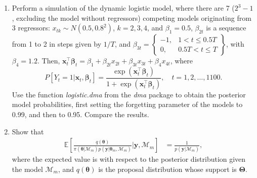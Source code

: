 \begin{enumerate}
\item Perform a simulation of the dynamic logistic model, where there are 7 ($2^3 - 1$, excluding the model without regressors) competing models originating from 3 regressors: $x_{tk} \sim N(0.5, 0.8^2)$, $k = 2, 3, 4$, and $\beta_1 = 0.5$, $\beta_{2t}$ is a sequence from 1 to 2 in steps given by $1/T$, and $\beta_{3t} = \begin{Bmatrix}
	-1, & 1 < t \leq 0.5T \\
	0, & 0.5T < t \leq T
\end{Bmatrix}$, with $\beta_4 = 1.2$. Then, $\bm{x}_t^{\top} \bm{\beta}_t = \beta_1 + \beta_{2t} x_{2t} + \beta_{3t} x_{3t} + \beta_4 x_{4t}$, where 
\[
P[Y_t = 1 | \bm{x}_t, \bm{\beta}_t] = \frac{\exp(\bm{x}_t^{\top} \bm{\beta}_t)}{1 + \exp(\bm{x}_t^{\top} \bm{\beta}_t)}, \quad t = 1, 2, \dots, 1100.
\]
Use the function \textit{logistic.dma} from the \textit{dma} package to obtain the posterior model probabilities, first setting the forgetting parameter of the models to 0.99, and then to 0.95. Compare the results.

\item Show that 
\begin{align*}
	\mathbb{E}\left[\frac{q(\bm{\theta})}{\pi(\bm{\theta}|\mathcal{M}_m)p(\bm{y}|\bm{\theta}_m,\mathcal{M}_m)}\biggr\rvert \bm{y},\mathcal{M}_m\right]&=\frac{1}{p(\bm{y}|\mathcal{M}_m)},
\end{align*}
where the expected value is with respect to the posterior distribution given the model $\mathcal{M}_m$, and $q(\bm{\theta})$ is the proposal distribution whose support is $\bm{\Theta}$.        
	
\end{enumerate}